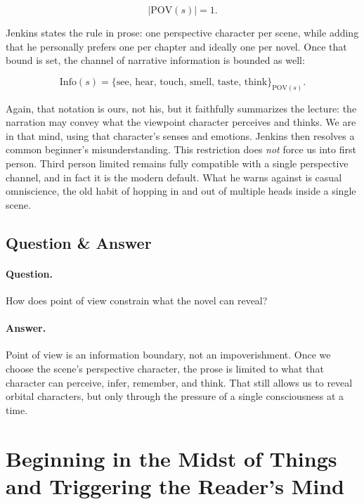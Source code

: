 \begin{equation}
|\mathrm{POV}(s)|=1.
\end{equation}

Jenkins states the rule in prose: one perspective character per scene, while adding that he personally prefers one per chapter and ideally one per novel. Once that bound is set, the channel of narrative information is bounded as well:

\begin{equation}
\mathrm{Info}(s)=\{\text{see, hear, touch, smell, taste, think}\}_{\mathrm{POV}(s)}.
\end{equation}

Again, that notation is ours, not his, but it faithfully summarizes the lecture: the narration may convey what the viewpoint character perceives and thinks. We are in that mind, using that character's senses and emotions. Jenkins then resolves a common beginner's misunderstanding. This restriction does \emph{not} force us into first person. Third person limited remains fully compatible with a single perspective channel, and in fact it is the modern default. What he warns against is casual omniscience, the old habit of hopping in and out of multiple heads inside a single scene.

\subsection{Question \& Answer}

\paragraph{Question.} How does point of view constrain what the novel can reveal?

\paragraph{Answer.} Point of view is an information boundary, not an impoverishment. Once we choose the scene's perspective character, the prose is limited to what that character can perceive, infer, remember, and think. That still allows us to reveal orbital characters, but only through the pressure of a single consciousness at a time.

\section{Beginning in the Midst of Things and Triggering the Reader's Mind}

